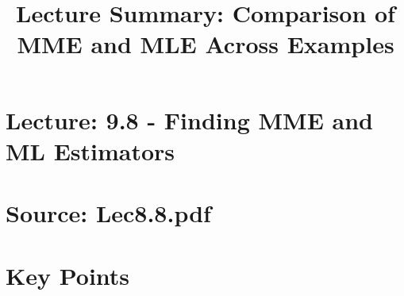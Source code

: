 \documentclass{article}
\title{Lecture Summary: Comparison of MME and MLE Across Examples}
\author{}
\date{}
\begin{document}
\maketitle

\section*{Lecture: 9.8 - Finding MME and ML Estimators}
\section*{Source: Lec8.8.pdf}

\section*{Key Points}
\end{document}
